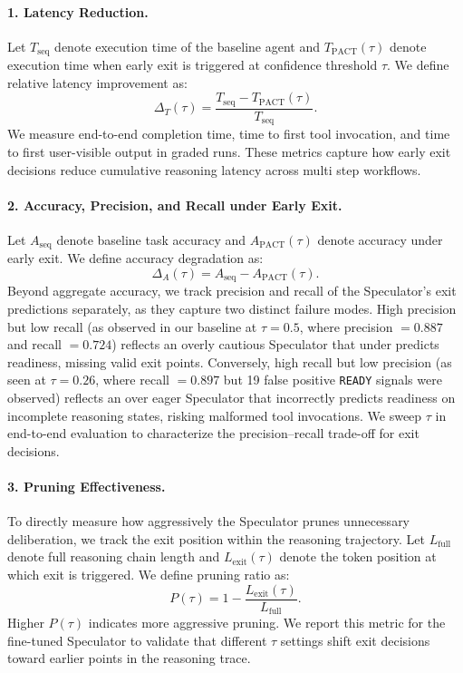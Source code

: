 \documentclass[letterpaper,twocolumn,10pt]{article}
\begin{document}
\paragraph{1. Latency Reduction.}
Let $T_{\text{seq}}$ denote execution time of the baseline agent and 
$T_{\text{PACT}}(\tau)$ denote execution time when early exit is triggered at 
confidence threshold $\tau$. We define relative latency improvement as:
\[
\Delta_T(\tau) = \frac{T_{\text{seq}} - T_{\text{PACT}}(\tau)}{T_{\text{seq}}}.
\]
We measure end-to-end completion time, time to first tool invocation, 
and time to first user-visible output in graded runs. These metrics capture how early exit decisions 
reduce cumulative reasoning latency across multi step workflows.

\paragraph{2. Accuracy, Precision, and Recall under Early Exit.}
Let $A_{\text{seq}}$ denote baseline task accuracy and $A_{\text{PACT}}(\tau)$ 
denote accuracy under early exit. We define accuracy degradation as:
\[
\Delta_A(\tau) = A_{\text{seq}} - A_{\text{PACT}}(\tau).
\]
Beyond aggregate accuracy, we track precision and recall of the Speculator's 
exit predictions separately, as they capture two distinct failure modes. High 
precision but low recall (as observed in our baseline at $\tau = 0.5$, 
where precision $= 0.887$ and recall $= 0.724$) reflects an overly cautious 
Speculator that under predicts readiness, missing valid exit points. 
Conversely, high recall but low precision (as seen at $\tau = 0.26$, where 
recall $= 0.897$ but 19 false positive \texttt{READY} signals were observed) 
reflects an over eager Speculator that incorrectly predicts readiness on 
incomplete reasoning states, risking malformed tool invocations. We sweep 
$\tau$ in end-to-end evaluation to characterize the precision--recall trade-off for exit decisions.

\paragraph{3. Pruning Effectiveness.}
To directly measure how aggressively the Speculator prunes unnecessary 
deliberation, we track the exit position within the reasoning trajectory. 
Let $L_{\text{full}}$ denote full reasoning chain length and 
$L_{\text{exit}}(\tau)$ denote the token position at which exit is triggered. 
We define pruning ratio as:
\[
P(\tau) = 1 - \frac{L_{\text{exit}}(\tau)}{L_{\text{full}}}.
\]
Higher $P(\tau)$ indicates more aggressive pruning. We report this metric 
for the fine-tuned Speculator to validate that different $\tau$ settings shift exit 
decisions toward earlier points in the reasoning trace.
\end{document}
